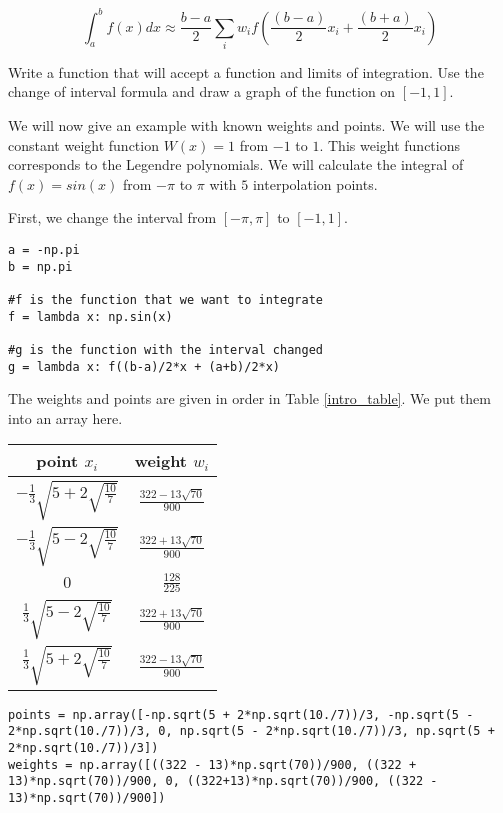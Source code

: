 \[
\int_a^b f(x) dx \approx \frac{b - a}{2} \sum_i w_if(\frac{(b-a)}{2}x_i + \frac{(b+a)}{2}x_i)
\]

\begin{problem}
Write a function that will accept a function and limits of integration.  Use the change of interval formula and draw a graph of the function on $[-1,1]$.
\end{problem}

We will now give an example with known weights and points.  We will use the constant weight function $W(x) = 1$ from $-1$ to $1$.  This weight functions corresponds to the Legendre polynomials.  We will calculate the integral of $f(x) = sin(x)$ from $-\pi$ to $\pi$ with $5$ interpolation points.

First, we change the interval from $[-\pi, \pi]$ to $[-1,1]$.

\begin{lstlisting}
a = -np.pi
b = np.pi

#f is the function that we want to integrate
f = lambda x: np.sin(x)

#g is the function with the interval changed
g = lambda x: f((b-a)/2*x + (a+b)/2*x)

\end{lstlisting}

The weights and points are given in order in Table \ref{intro_table}.  We put them into an array here.
\begin{center}
\begin{tabular}{|c|c|}
\hline
point $x_i$ & weight $w_i$ \\
\hline
$-\frac{1}{3}\sqrt{5 + 2\sqrt{\frac{10}{7}}}$ &  $\frac{322-13\sqrt{70}}{900}$ \\
\hline
$-\frac{1}{3}\sqrt{5 - 2\sqrt{\frac{10}{7}}}$ & $\frac{322+13\sqrt{70}}{900}$ \\
\hline
$0$ & $\frac{128}{225}$ \\
\hline
$\frac{1}{3}\sqrt{5 - 2\sqrt{\frac{10}{7}}}$ & $\frac{322+13\sqrt{70}}{900}$ \\
\hline
$\frac{1}{3}\sqrt{5 + 2\sqrt{\frac{10}{7}}}$ & $\frac{322-13\sqrt{70}}{900}$
\hline
\label{intro_table}
\end{tabular}
\end{center}
\begin{lstlisting}
points = np.array([-np.sqrt(5 + 2*np.sqrt(10./7))/3, -np.sqrt(5 - 2*np.sqrt(10./7))/3, 0, np.sqrt(5 - 2*np.sqrt(10./7))/3, np.sqrt(5 + 2*np.sqrt(10./7))/3]) 
weights = np.array([((322 - 13)*np.sqrt(70))/900, ((322 + 13)*np.sqrt(70))/900, 0, ((322+13)*np.sqrt(70))/900, ((322 - 13)*np.sqrt(70))/900])
\end{lstlisting}

